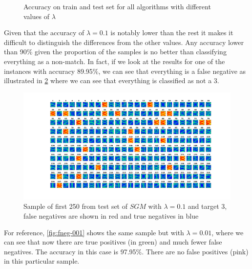\begin{figure}[H]
    
    \caption{Accuracy on train and test set for all algorithms with different values of $\lambda$}
    \label{fig:lambda_acc_2}
\end{figure}

Given that the accuracy of $\lambda=0.1$ is notably lower than the rest it
makes it difficult to distinguish the differences from the other values.
Any accuracy lower than 90\% given the proportion of the samples is no better
than classifying everything as a non-match.
In fact, if we look at the results for one of the instances with accuracy 89.95\%,
we can see that everything is a false negative as illustrated in \cref{fig:fneg} where
we can see that everything is classified as not a 3.

\begin{figure}[H]
    \includegraphics[width=\textwidth]{../src/SGM_te_plot_2k_01.png}
    \caption{Sample of first 250 from test set of $SGM$ with $\lambda=0.1$ and target 3,
    false negatives are shown in red and true negatives in blue}
    \label{fig:fneg}
\end{figure}

For reference, \cref{fig:fneg-001} shows the same sample but with $\lambda=0.01$, where
we can see that now there are true positives (in green) and much fewer false negatives.
The accuracy in this case is 97.95\%. There are no false positives (pink) in this particular
sample.

